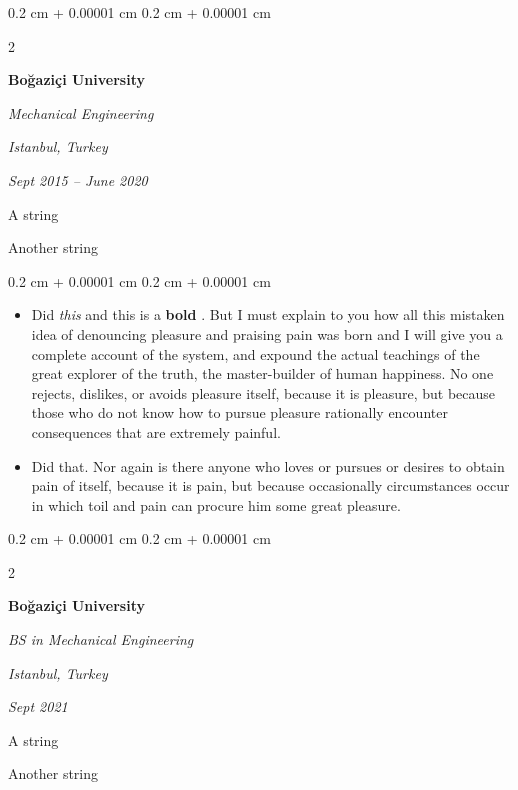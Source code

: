 \documentclass[10pt, letterpaper]{article}
\newenvironment{summary}{
    \begin{description}[
        topsep=0.10 cm,
        parsep=0.10 cm,
        partopsep=0pt,
        itemsep=0pt,
        leftmargin=0.4 cm + 10pt
    ]
}{
    \end{description}
} %
\newenvironment{highlights}{
    \begin{itemize}[
        topsep=0.10 cm,
        parsep=0.10 cm,
        partopsep=0pt,
        itemsep=0pt,
        leftmargin=0.4 cm + 10pt
    ]
}{
    \end{itemize}
} %
\newenvironment{onecolentry}{
    \begin{adjustwidth}{
        0.2 cm + 0.00001 cm
    }{
        0.2 cm + 0.00001 cm
    }
}{
    \end{adjustwidth}
} %
\newenvironment{twocolentry}[2][]{
    \onecolentry
    \def\secondColumn{#2}
    \setcolumnwidth{\fill, 4.5 cm}
    \begin{paracol}{2}
}{
    \switchcolumn \raggedleft \secondColumn
    \end{paracol}
    \endonecolentry
} %
\let\hrefWithoutArrow\href
\renewcommand{\href}[2]{\hrefWithoutArrow{#1}{\ifthenelse{\equal{#2}{}}{ }{#2 }\raisebox{.15ex}{\footnotesize \faExternalLink*}}}
\begin{document}
        \begin{twocolentry}{
        \textit{Istanbul, Turkey}    
            
        \textit{Sept 2015 – June 2020}}
            \textbf{Boğaziçi University}

            \textit{Mechanical Engineering}
        \end{twocolentry}
            \begin{summary}
                \item A string
                \item Another string
            \end{summary}
        \vspace{0.10 cm}
        \begin{onecolentry}
            \begin{highlights}
                \item Did \textit{this} and this is a \textbf{bold} \href{https://example.com}{link}. But I must explain to you how all this mistaken idea of denouncing pleasure and praising pain was born and I will give you a complete account of the system, and expound the actual teachings of the great explorer of the truth, the master-builder of human happiness. No one rejects, dislikes, or avoids pleasure itself, because it is pleasure, but because those who do not know how to pursue pleasure rationally encounter consequences that are extremely painful.
                \item Did that. Nor again is there anyone who loves or pursues or desires to obtain pain of itself, because it is pain, but because occasionally circumstances occur in which toil and pain can procure him some great pleasure.
            \end{highlights}
        \end{onecolentry}


        \vspace{0.2 cm}

        \begin{twocolentry}{
        \textit{Istanbul, Turkey}    
            
        \textit{Sept 2021}}
            \textbf{Boğaziçi University}

            \textit{BS in Mechanical Engineering}
        \end{twocolentry}
            \begin{summary}
                \item A string
                \item Another string
            \end{summary}
\end{document}
